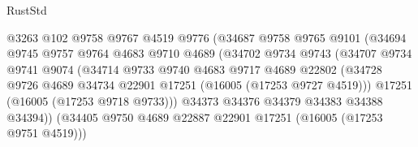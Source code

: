 \begin{lexlean}{RustStd}
\begin{coremodule}
                                    @3263
                                    @102
                                    @9758
                                    @9767
                                    @4519
                                    @9776
                                    (@34687
                                      @9758
                                      @9765
                                      @9101
                                      (@34694
                                        @9745
                                        @9757
                                        @9764
                                        @4683
                                        @9710
                                        @4689
                                        (@34702
                                          @9734
                                          @9743
                                          (@34707
                                            @9734
                                            @9741
                                            @9074
                                            (@34714
                                              @9733
                                              @9740
                                              @4683
                                              @9717
                                              @4689
                                              @22802
                                              (@34728
                                                @9726
                                                @4689
                                                @34734
                                                @22901
                                                @17251
                                                (@16005 (@17253 @9727 @4519)))
                                              @17251
                                              (@16005 (@17253 @9718 @9733)))
                                            @34373
                                            @34376
                                            @34379
                                            @34383
                                            @34388
                                            @34394))
                                        (@34405
                                          @9750
                                          @4689
                                          @22887
                                          @22901
                                          @17251
                                          (@16005 (@17253 @9751 @4519)))

\end{coremodule}
\end{lexlean}
